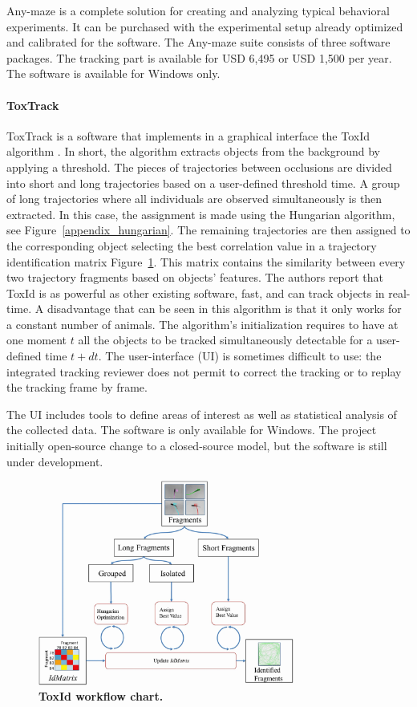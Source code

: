     Any-maze is a complete solution for creating and analyzing typical behavioral experiments. It can be purchased with the experimental setup already optimized and calibrated for the software. The Any-maze suite consists of three software packages. The tracking part is available for USD 6,495 or USD 1,500 per year. The software is available for Windows only.

    \paragraph{ToxTrack}
    ToxTrack \cite{rodriguez2018toxtrac} is a software that implements in a graphical interface the ToxId algorithm \cite{rodriguez2017toxid}. In short, the algorithm extracts objects from the background by applying a threshold. The pieces of trajectories between occlusions are divided into short and long trajectories based on a user-defined threshold time. A group of long trajectories where all individuals are observed simultaneously is then extracted. In this case, the assignment is made using the Hungarian algorithm, see Figure~\ref{appendix_hungarian}. The remaining trajectories are then assigned to the corresponding object selecting the best correlation value in a trajectory identification matrix Figure~\ref{part_1:toxId}. This matrix contains the similarity between every two trajectory fragments based on objects' features.
    The authors report that ToxId is as powerful as other existing software, fast, and can track objects in real-time. A disadvantage that can be seen in this algorithm is that it only works for a constant number of animals. The algorithm's initialization requires to have at one moment $t$ all the objects to be tracked simultaneously detectable for a user-defined time $t+dt$. The user-interface (UI) is sometimes difficult to use: the integrated tracking reviewer does not permit to correct the tracking or to replay the tracking frame by frame.

    The UI includes tools to define areas of interest as well as statistical analysis of the collected data. The software is only available for Windows. The project initially open-source change to a closed-source model, but the software is still under development.

    \begin{figure}[h]
    \centering
    \includegraphics[width=0.75\textwidth]{part_1/assets/toxId.png}
    \caption{{\bf ToxId workflow chart.}}
    \label{part_1:toxId}
    \end{figure}

